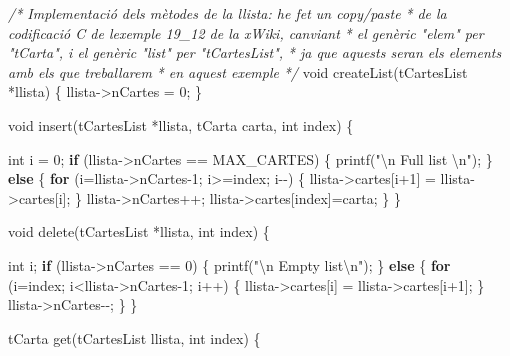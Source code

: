 \documentclass[]{book}
\newenvironment{Shaded}{\begin{snugshade}}{\end{snugshade}}
\newcommand{\CommentTok}[1]{\textcolor[rgb]{0.56,0.35,0.01}{\textit{#1}}}
\newcommand{\ControlFlowTok}[1]{\textcolor[rgb]{0.13,0.29,0.53}{\textbf{#1}}}
\newcommand{\DataTypeTok}[1]{\textcolor[rgb]{0.13,0.29,0.53}{#1}}
\newcommand{\DecValTok}[1]{\textcolor[rgb]{0.00,0.00,0.81}{#1}}
\newcommand{\NormalTok}[1]{#1}
\newcommand{\SpecialCharTok}[1]{\textcolor[rgb]{0.00,0.00,0.00}{#1}}
\newcommand{\StringTok}[1]{\textcolor[rgb]{0.31,0.60,0.02}{#1}}
\begin{document}
\begin{Shaded}
\begin{Highlighting}[]
\CommentTok{/* Implementació dels mètodes de la llista: he fet un copy/paste}
\CommentTok{ * de la codificació C de l\textquotesingle{}exemple 19\_12 de la xWiki, canviant}
\CommentTok{ * el genèric "elem" per "tCarta", i el genèric "list" per "tCartesList",}
\CommentTok{ * ja que aquests seran els elements amb els que treballarem}
\CommentTok{ * en aquest exemple }
\CommentTok{ */}
\DataTypeTok{void}\NormalTok{ createList(tCartesList *llista) \{}
\NormalTok{    llista{-}\textgreater{}nCartes = }\DecValTok{0}\NormalTok{;}
\NormalTok{\}}

\DataTypeTok{void}\NormalTok{ insert(tCartesList *llista, tCarta carta, }\DataTypeTok{int}\NormalTok{ index) \{}

    \DataTypeTok{int}\NormalTok{ i = }\DecValTok{0}\NormalTok{;}
    \ControlFlowTok{if}\NormalTok{ (llista{-}\textgreater{}nCartes == MAX\_CARTES) \{}
\NormalTok{        printf(}\StringTok{"}\SpecialCharTok{\textbackslash{}n}\StringTok{ Full list }\SpecialCharTok{\textbackslash{}n}\StringTok{"}\NormalTok{);}
\NormalTok{    \} }\ControlFlowTok{else}\NormalTok{ \{}
        \ControlFlowTok{for}\NormalTok{ (i=llista{-}\textgreater{}nCartes{-}}\DecValTok{1}\NormalTok{; i\textgreater{}=index; i{-}{-}) \{}
\NormalTok{            llista{-}\textgreater{}cartes[i+}\DecValTok{1}\NormalTok{] = llista{-}\textgreater{}cartes[i];}
\NormalTok{        \}}
\NormalTok{        llista{-}\textgreater{}nCartes++;}
\NormalTok{        llista{-}\textgreater{}cartes[index]=carta;}
\NormalTok{    \}}
\NormalTok{\}}

\DataTypeTok{void}\NormalTok{ delete(tCartesList *llista, }\DataTypeTok{int}\NormalTok{ index) \{}

    \DataTypeTok{int}\NormalTok{ i;}
    \ControlFlowTok{if}\NormalTok{ (llista{-}\textgreater{}nCartes == }\DecValTok{0}\NormalTok{) \{}
\NormalTok{        printf(}\StringTok{"}\SpecialCharTok{\textbackslash{}n}\StringTok{ Empty list}\SpecialCharTok{\textbackslash{}n}\StringTok{"}\NormalTok{);}
\NormalTok{    \} }\ControlFlowTok{else}\NormalTok{ \{}
        \ControlFlowTok{for}\NormalTok{ (i=index; i\textless{}llista{-}\textgreater{}nCartes{-}}\DecValTok{1}\NormalTok{; i++) \{}
\NormalTok{            llista{-}\textgreater{}cartes[i] = llista{-}\textgreater{}cartes[i+}\DecValTok{1}\NormalTok{];}
\NormalTok{        \}}
\NormalTok{        llista{-}\textgreater{}nCartes{-}{-};}
\NormalTok{    \}}
\NormalTok{\}}

\NormalTok{tCarta get(tCartesList llista, }\DataTypeTok{int}\NormalTok{ index) \{}


\end{Highlighting}
\end{Shaded}
\end{document}
